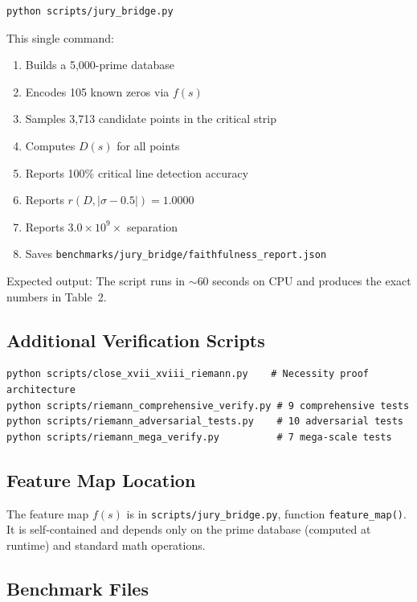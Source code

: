\documentclass[11pt]{article}
\begin{document}
\begin{verbatim}
python scripts/jury_bridge.py
\end{verbatim}

This single command:
\begin{enumerate}[nosep]
\item Builds a 5,000-prime database
\item Encodes 105 known zeros via $f(s)$
\item Samples 3,713 candidate points in the critical strip
\item Computes $D(s)$ for all points
\item Reports 100\% critical line detection accuracy
\item Reports $r(D, |\sigma-0.5|) = 1.0000$
\item Reports $3.0 \times 10^9\times$ separation
\item Saves \texttt{benchmarks/jury\_bridge/faithfulness\_report.json}
\end{enumerate}

Expected output: The script runs in $\sim$60 seconds on CPU and produces the exact numbers in Table~2.

\subsection{Additional Verification Scripts}

\begin{verbatim}
python scripts/close_xvii_xviii_riemann.py    # Necessity proof architecture
python scripts/riemann_comprehensive_verify.py # 9 comprehensive tests
python scripts/riemann_adversarial_tests.py    # 10 adversarial tests
python scripts/riemann_mega_verify.py          # 7 mega-scale tests
\end{verbatim}

\subsection{Feature Map Location}

The feature map $f(s)$ is in \texttt{scripts/jury\_bridge.py}, function \texttt{feature\_map()}. It is self-contained and depends only on the prime database (computed at runtime) and standard math operations.

\subsection{Benchmark Files}
\end{document}
